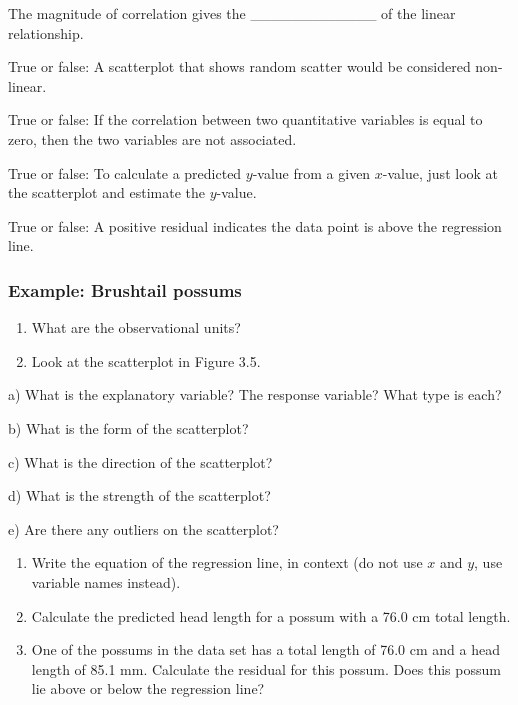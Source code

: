 \documentclass[
]{report}
\newcommand{\rgs}{\vspace{12pt}} %
\newcommand{\rgi}{\hspace{24pt}}  %
\begin{document}
\rgi The magnitude of correlation gives the \_\_\_\_\_\_\_\_\_\_\_\_ of the linear relationship.

True or false: A scatterplot that shows random scatter would be considered non-linear.

True or false: If the correlation between two quantitative variables is equal to zero, then the two variables are not associated.

True or false: To calculate a predicted \(y\)-value from a given \(x\)-value, just look at the scatterplot and estimate the \(y\)-value.

True or false: A positive residual indicates the data point is above the regression line.

\newpage

\hypertarget{example-brushtail-possums}{%
\subsubsection*{Example: Brushtail possums}\label{example-brushtail-possums}}

\begin{enumerate}
\def\labelenumi{\arabic{enumi}.}
\item
  What are the observational units?\\
  \rgs
\item
  Look at the scatterplot in Figure 3.5.
\end{enumerate}

\rgi a) What is the explanatory variable? The response variable? What type is each?
\rgs

\rgi b) What is the form of the scatterplot?
\rgs

\rgi c) What is the direction of the scatterplot?
\rgs

\rgi d) What is the strength of the scatterplot?
\rgs

\rgi e) Are there any outliers on the scatterplot?
\rgs

\begin{enumerate}
\def\labelenumi{\arabic{enumi}.}
\setcounter{enumi}{2}
\item
  Write the equation of the regression line, in context (do not use \(x\) and \(y\), use variable names instead).
  \rgs
\item
  Calculate the predicted head length for a possum with a 76.0 cm total length.
  \rgs
\item
  One of the possums in the data set has a total length of 76.0 cm and a head length of 85.1 mm. Calculate the residual for this possum. Does this possum lie above or below the regression line?
  \rgs
\end{enumerate}
\end{document}
